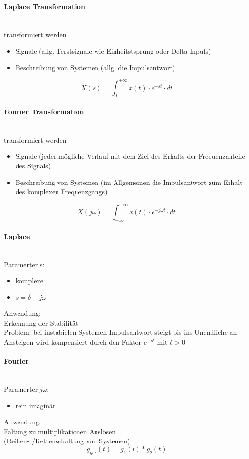 \documentclass{article}
\begin{document}
\paragraph{Laplace Transformation} \mbox{} \\
transformiert werden 
\begin{itemize}
	\item Signale (allg. Terstsignale wie Einheitstsprung oder Delta-Inpuls)
	\item Beschreibung von Systemen (allg. die Impulsantwort)
\end{itemize}
\[ X(s) = \int_{0}^{+\infty} x(t) \cdot e^{-st} \cdot dt \]
\paragraph{Fourier Transformation} \mbox{} \\
transformiert werden
\begin{itemize}
	\item Signale (jeder mögliche Verlauf mit dem Ziel des Erhalts der Frequenzanteile des Signals)
	\item Beschreibung von Systemen (im Allgemeinen die Impulsantwort zum Erhalt des komplexen Frequenzgangs)
\end{itemize}
\[ X(j\omega) = \int_{-\infty}^{+\infty} x(t) \cdot e^{-j\omega t} \cdot dt \]

\begin{paracol}{2}
	\paragraph{Laplace} \mbox{} \\
	Paramerter s:
	\begin{itemize}
		\item komplexe
		\item $s = \delta + j\omega$
	\end{itemize}
	Anwendung: \\
	Erkennung der Stabilität \\
	Problem: bei instabielen Systemen Impulsantwort steigt bis ins Unendliche an Ansteigen wird kompensiert durch den Faktor $e^{-st}$ mit $\delta > 0$
	\switchcolumn
	\paragraph{Fourier} \mbox{} \\
	Paramerter $j \omega$:
	\begin{itemize}
		\item rein imaginär
	\end{itemize}
	Anwendung: \\
	Faltung zu multiplikationen Auslösen \\
	(Reihen- /Kettenschaltung von Systemen)
	\[ g_{ges}(t) = g_1(t) * g_2(t) \]
\end{paracol}
\end{document}
